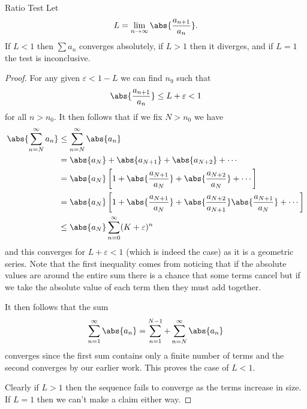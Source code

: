 \documentclass[fleqn]{NotesClass}
\begin{document}
    \begin{lma}{Ratio Test}{}
        Let
        \begin{equation}
            L = \lim_{n\to\infty} \abs{\frac{a_{n+1}}{a_n}}.
        \end{equation}
        If \(L < 1\) then \(\sum a_n\) converges absolutely, if \(L > 1\) then it diverges, and if \(L = 1\) the test is inconclusive.
        
        \begin{proof}
            For any given \(\varepsilon < 1 - L\) we can find \(n_9\) such that
            \begin{equation}
                \abs{\frac{a_{n+1}}{a_n}} \le L + \varepsilon < 1
            \end{equation}
            for all \(n > n_0\).
            It then follows that if we fix \(N > n_0\) we have
            \begin{align}
                \abs{\sum_{n=N}^{\infty} a_n} &\le \sum_{n=N}^{\infty} \abs{a_n}\\
                &= \abs{a_N} + \abs{a_{N+1}} + \abs{a_{N+2}} + \dotsb\\
                &= \abs{a_N}\left[ 1 + \abs{\frac{a_{N+1}}{a_N}} + \abs{\frac{a_{N+2}}{a_{N}}} + \dotsb \right]\\
                &= \abs{a_N} \left[ 1 + \abs{\frac{a_{N+1}}{a_N}} + \abs{\frac{a_{N+2}}{a_{N+1}}}\abs{\frac{a_{N+1}}{a_N}} + \dotsb \right]\\
                &\le \abs{a_N} \sum_{n=0}^{\infty} (K + \varepsilon)^{n}
            \end{align}
            and this converges for \(L + \varepsilon < 1\) (which is indeed the case) as it is a geometric series.
            Note that the first inequality comes from noticing that if the absolute values are around the entire sum there is a chance that some terms cancel but if we take the absolute value of each term then they must add together.
            
            It then follows that the sum
            \begin{equation}
                \sum_{n=1}^{\infty} \abs{a_n} = \sum_{n=1}^{N-1} + \sum_{n=N}^{\infty} \abs{a_n}
            \end{equation}
            converges since the first sum contains only a finite number of terms and the second converges by our earlier work.
            This proves the case of \(L < 1\).
            
            Clearly if \(L > 1\) then the sequence fails to converge as the terms increase in size.
            If \(L = 1\) then we can't make a claim either way.
        \end{proof}
    \end{lma}
    
\end{document}
